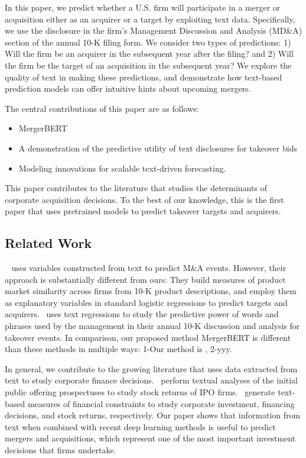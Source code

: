 \documentclass[11pt]{article}
\begin{document}
In this paper, we predict whether a U.S. firm will participate in a
merger or acquisition either as an acquirer or a target by exploiting
text data. Specifically, we use the disclosure in the firm's Management
Discussion and Analysis (MD\&A) section of the annual 10-K
filing form. We consider two types of predictions: 1) Will the firm be an acquirer in the subsequent year after the filing? and 2) Will the firm
be the target of an acquisition in the subsequent year? We explore the quality of text
in making these predictions, and demonstrate how text-based prediction models can offer
intuitive hints about upcoming mergers.


The central contributions of this paper are as follows:

\begin{itemize}
\item MergerBERT 
\item A demonstration of the predictive utility of text disclosures for takeover bids
\item Modeling innovations for scalable text-driven forecasting.
\end{itemize}
  
This paper contributes to the literature that studies the determinants of corporate
acquisition decisions. To the best of our knowledge, this is the first
paper that uses pretrained models to predict takeover targets and
acquirers.


\subsection{Related Work}

~\cite{hoberg2010} uses variables constructed from text to predict M\&A events. However, their approach is substantially different from ours: They build measures of product market similarity across
firms from 10-K product descriptions, and employ them as explanatory variables in standard
logistic regressions to predict targets and acquirers.~\cite{routledge2013} uses text regressions to study the predictive power of words and phrases used by the management in their annual
10-K discussion and analysis for takeover events. In comparison, our proposed method MergerBERT is different than these methods in
multiple ways: 1-Our method is , 2-yyy.

In general, we contribute to the growing literature that uses data extracted from
text to study corporate finance decisions.~\cite{loughran2013,jegadeesh2013} perform textual analyses of the initial public offering prospectuses to study stock
returns of IPO firms.~\cite{hoberg2015,bodnaruk2015,Buehlmaier2015} generate text-based measures of financial constraints
to study corporate investment, financing decisions, and stock returns, respectively.
Our paper shows that information from text when combined with recent deep learning methods is useful to predict mergers and acquisitions,
which represent one of the most important investment decisions that firms undertake.
\end{document}

